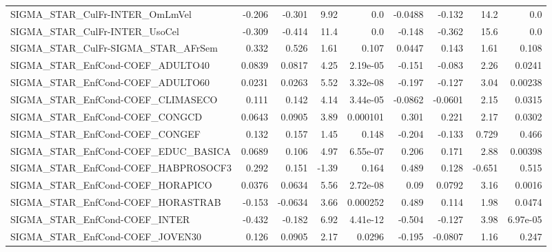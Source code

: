 \begin{tabular}{lrrrrrrrr}
SIGMA\_STAR\_CulFr-INTER\_OmLmVel        &      -0.206 &       -0.301 &    9.92 &      0.0 &    -0.0488 &      -0.132 &         14.2 &           0.0 \\
SIGMA\_STAR\_CulFr-INTER\_UsoCel         &      -0.309 &       -0.414 &    11.4 &      0.0 &     -0.148 &      -0.362 &         15.6 &           0.0 \\
SIGMA\_STAR\_CulFr-SIGMA\_STAR\_AFrSem    &       0.332 &        0.526 &    1.61 &    0.107 &     0.0447 &       0.143 &         1.61 &         0.108 \\
SIGMA\_STAR\_EnfCond-COEF\_ADULTO40      &      0.0839 &       0.0817 &    4.25 & 2.19e-05 &     -0.151 &      -0.083 &         2.26 &        0.0241 \\
SIGMA\_STAR\_EnfCond-COEF\_ADULTO60      &      0.0231 &       0.0263 &    5.52 & 3.32e-08 &     -0.197 &      -0.127 &         3.04 &       0.00238 \\
SIGMA\_STAR\_EnfCond-COEF\_CLIMASECO     &       0.111 &        0.142 &    4.14 & 3.44e-05 &    -0.0862 &     -0.0601 &         2.15 &        0.0315 \\
SIGMA\_STAR\_EnfCond-COEF\_CONGCD        &      0.0643 &       0.0905 &    3.89 & 0.000101 &      0.301 &       0.221 &         2.17 &        0.0302 \\
SIGMA\_STAR\_EnfCond-COEF\_CONGEF        &       0.132 &        0.157 &    1.45 &    0.148 &     -0.204 &      -0.133 &        0.729 &         0.466 \\
SIGMA\_STAR\_EnfCond-COEF\_EDUC\_BASICA   &      0.0689 &        0.106 &    4.97 & 6.55e-07 &      0.206 &       0.171 &         2.88 &       0.00398 \\
SIGMA\_STAR\_EnfCond-COEF\_HABPROSOCF3   &       0.292 &        0.151 &   -1.39 &    0.164 &      0.489 &       0.128 &       -0.651 &         0.515 \\
SIGMA\_STAR\_EnfCond-COEF\_HORAPICO      &      0.0376 &       0.0634 &    5.56 & 2.72e-08 &       0.09 &      0.0792 &         3.16 &        0.0016 \\
SIGMA\_STAR\_EnfCond-COEF\_HORASTRAB     &      -0.153 &      -0.0634 &    3.66 & 0.000252 &      0.489 &       0.114 &         1.98 &        0.0474 \\
SIGMA\_STAR\_EnfCond-COEF\_INTER         &      -0.432 &       -0.182 &    6.92 & 4.41e-12 &     -0.504 &      -0.127 &         3.98 &      6.97e-05 \\
SIGMA\_STAR\_EnfCond-COEF\_JOVEN30       &       0.126 &       0.0905 &    2.17 &   0.0296 &     -0.195 &     -0.0807 &         1.16 &         0.247 \\

\end{tabular}
